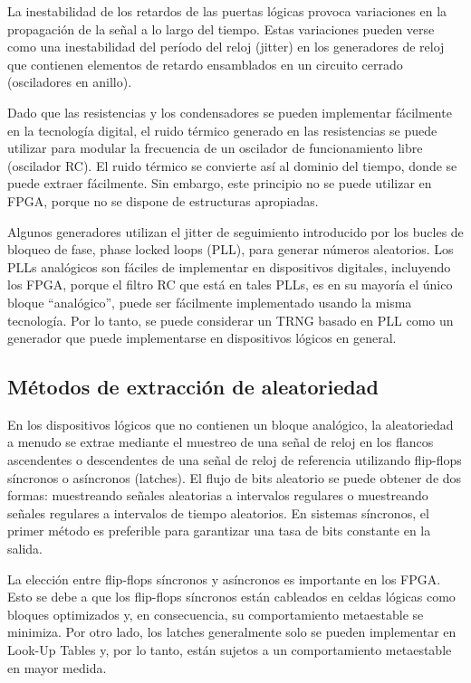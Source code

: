 	La inestabilidad de los retardos de las puertas lógicas provoca variaciones en la propagación de la señal a lo largo del tiempo. Estas variaciones pueden verse como una inestabilidad del período del reloj (jitter) en los generadores de reloj que contienen elementos de retardo ensamblados en un circuito cerrado (osciladores en anillo).
					
	Dado que las resistencias y los condensadores se pueden implementar fácilmente en la tecnología digital, el ruido térmico generado en las resistencias se puede utilizar para modular la frecuencia de un oscilador de funcionamiento libre (oscilador RC). El ruido térmico se convierte así al dominio del tiempo, donde se puede extraer fácilmente. Sin embargo, este principio no se puede utilizar en FPGA, porque no se dispone de estructuras apropiadas.
					
	Algunos generadores utilizan el jitter de seguimiento introducido por los bucles de bloqueo de fase, phase locked loops (PLL), para generar números aleatorios. Los PLLs analógicos son fáciles de implementar en dispositivos digitales, incluyendo los FPGA, porque el filtro RC que está en tales PLLs, es en su mayoría el único bloque ``analógico'', puede ser fácilmente implementado usando la misma tecnología. Por lo tanto, se puede considerar un TRNG basado en PLL como un generador que puede implementarse en dispositivos lógicos en general.
	
	
	\subsection{Métodos de extracción de aleatoriedad}	
	
	En los dispositivos lógicos que no contienen un bloque analógico, la aleatoriedad a menudo se extrae mediante el muestreo de una señal de reloj en los flancos ascendentes o descendentes de una señal de reloj de referencia utilizando flip-flops síncronos o asíncronos (latches). El flujo de bits aleatorio se puede obtener de dos formas: muestreando señales aleatorias a intervalos regulares o muestreando señales regulares a intervalos de tiempo aleatorios. En sistemas síncronos, el primer método es preferible para garantizar una tasa de bits constante en la salida.
					
	La elección entre flip-flops síncronos y asíncronos es importante en los FPGA. Esto se debe a que los flip-flops síncronos están cableados en celdas lógicas como bloques optimizados y, en consecuencia, su comportamiento metaestable se minimiza. Por otro lado, los latches generalmente solo se pueden implementar en Look-Up Tables  y, por lo tanto, están sujetos a un comportamiento metaestable en mayor medida. 
	
